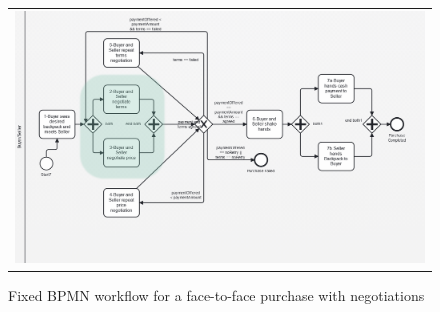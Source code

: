 \begin{figure}[t]
  \begin{center}
    \begin{tabular}{c}
        \includegraphics[width=\textwidth]{paper/figs/BPMN/face2face_May_5_2023_workflow_fixed.png}
    \end{tabular}
  \end{center}
\caption{Fixed BPMN workflow for a face-to-face purchase with negotiations}
\label{fig:face2face_bpmn_fixed}
\end{figure}